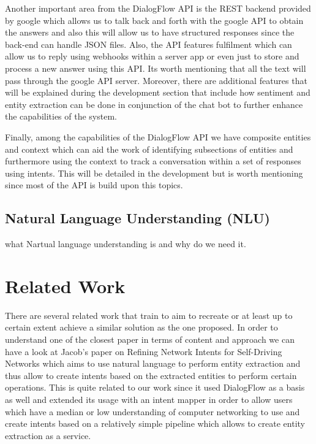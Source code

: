 Another important area from the DialogFlow API is the REST backend provided by google which allows us to talk back and forth with the google API to obtain the answers and also this will allow us to have structured responses since the back-end can handle JSON files. Also, the API features fulfilment which can allow us to reply using webhooks within a server app or even just to store and process a new answer using this API. Its worth mentioning that all the text will pass through the google API server. Moreover, there are additional features that will be explained during the development section that include how sentiment and entity extraction can be done in conjunction of the chat bot to further enhance the capabilities of the system. 

Finally, among the capabilities of the DialogFlow API we have composite entities and context which can aid the work of identifying subsections of entities and furthermore using the context to track a conversation within a set of responses using intents. This will be detailed in the development but is worth mentioning since most of the API is build upon this topics.

\section{Natural Language Understanding (NLU)}
what Nartual language understanding is and why do we need it.

\chapter{Related Work}
There are several related work that train to aim to recreate or at least up to certain extent achieve a similar solution as the one proposed. In order to understand one of the closest paper in terms of content and approach we can have a look at Jacob's \cite{networkIntents} paper on Refining Network Intents for Self-Driving Networks which aims to use natural language to perform entity extraction and thus allow to create intents based on the extracted entities to perform certain operations. This is quite related to our work since it used DialogFlow as a basis as well and extended its usage with an intent mapper in order to allow users which have a median or low understanding of computer networking to use and create intents based on a relatively simple pipeline which allows to create entity extraction as a service.

